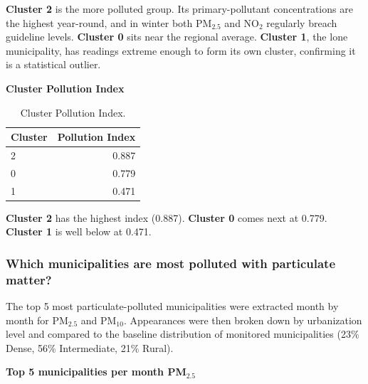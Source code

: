 \documentclass{article}
\begin{document}
	\textbf{Cluster 2} is the more polluted group. Its primary-pollutant concentrations are the highest year-round, and in winter both PM$_{2.5}$ and NO$_2$ regularly breach guideline levels.
	\textbf{Cluster 0} sits near the regional average. 
	\textbf{Cluster 1}, the lone municipality, has readings extreme enough to form its own cluster, confirming it is a statistical outlier.
	
	\textbf{Cluster Pollution Index} \\
	\begin{table}[H]
		\centering
		\begin{tabular}{lr}
			\hline
			Cluster & Pollution Index \\
			\hline
			2 & 0.887 \\
			0 & 0.779 \\
			1 & 0.471 \\
			\hline
		\end{tabular}
		\caption*{Cluster Pollution Index.}
	\end{table}

	 \textbf{Cluster 2} has the highest index (0.887). \textbf{Cluster 0} comes next at 0.779. \textbf{Cluster 1} is well below at 0.471.
	
	\newpage
	\subsubsection{Which municipalities are most polluted with particulate matter?}

	The top 5 most particulate-polluted municipalities were extracted month by month for PM$_{2.5}$ and PM$_{10}$. Appearances were then broken down by urbanization level and compared to the baseline distribution of monitored municipalities (23\% Dense, 56\% Intermediate, 21\% Rural).

	\textbf{Top 5 municipalities per month PM$_{2.5}$}
\end{document}
